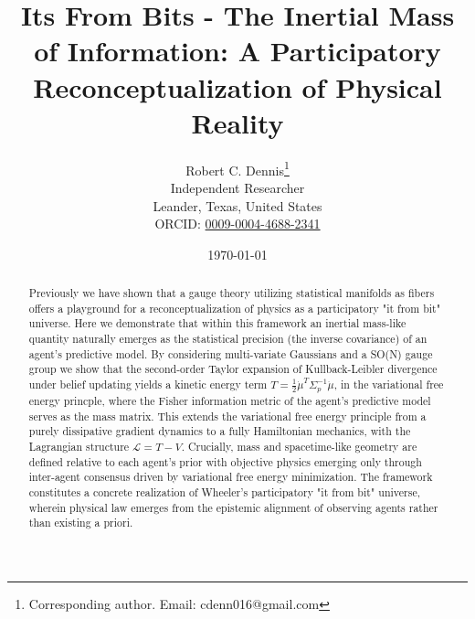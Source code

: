 \documentclass[11pt]{article}
\begin{document}
\title{Its From Bits - The Inertial Mass of Information: A Participatory Reconceptualization of Physical Reality}


\author{
  Robert C. Dennis\thanks{Corresponding author. Email: cdenn016@gmail.com}\\[0.3cm]
  \small Independent Researcher\\
  \small Leander, Texas, United States\\[0.2cm]
  \small ORCID: \href{https://orcid.org/0009-0004-4688-2341}{0009-0004-4688-2341} %
}

\date{\today}

\maketitle

\begin{abstract}
Previously we have shown that a gauge theory utilizing statistical manifolds as fibers offers a playground for a reconceptualization of physics as a participatory "it from bit" universe.  Here we demonstrate that within this framework an inertial mass-like quantity naturally emerges as the statistical precision (the inverse covariance) of an agent's predictive model. By considering multi-variate Gaussians and a SO(N) gauge group we show that the second-order Taylor expansion of Kullback-Leibler divergence under belief updating yields a kinetic energy term $T = \frac{1}{2}\dot{\mu}^T \Sigma_p^{-1} \dot{\mu}$, in the variational free energy princple, where the Fisher information metric of the agent's predictive model serves as the mass matrix. This extends the variational free energy principle from a purely dissipative gradient dynamics to a fully Hamiltonian mechanics, with the Lagrangian structure $\mathcal{L} = T - V$. Crucially, mass and spacetime-like geometry are defined relative to each agent's prior with objective physics emerging only through inter-agent consensus driven by variational free energy minimization. The framework constitutes a concrete realization of Wheeler's participatory "it from bit" universe, wherein physical law emerges from the epistemic alignment of observing agents rather than existing a priori.
\end{abstract}

\maketitle
\end{document}

